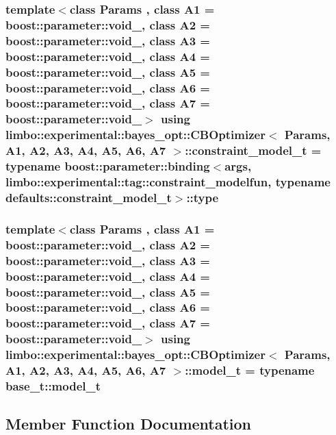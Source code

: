 \subsubsection[{\texorpdfstring{constraint\+\_\+model\+\_\+t}{constraint_model_t}}]{\setlength{\rightskip}{0pt plus 5cm}template$<$class Params , class A1  = boost\+::parameter\+::void\+\_\+, class A2  = boost\+::parameter\+::void\+\_\+, class A3  = boost\+::parameter\+::void\+\_\+, class A4  = boost\+::parameter\+::void\+\_\+, class A5  = boost\+::parameter\+::void\+\_\+, class A6  = boost\+::parameter\+::void\+\_\+, class A7  = boost\+::parameter\+::void\+\_\+$>$ using {\bf limbo\+::experimental\+::bayes\+\_\+opt\+::\+C\+B\+Optimizer}$<$ Params, A1, A2, A3, A4, A5, A6, A7 $>$\+::{\bf constraint\+\_\+model\+\_\+t} =  typename boost\+::parameter\+::binding$<${\bf args}, limbo\+::experimental\+::tag\+::constraint\+\_\+modelfun, typename {\bf defaults\+::constraint\+\_\+model\+\_\+t}$>$\+::type}\hypertarget{classlimbo_1_1experimental_1_1bayes__opt_1_1_c_b_optimizer_a5cb12c91d5ba4ea49768779178c6a2c6}{}\label{classlimbo_1_1experimental_1_1bayes__opt_1_1_c_b_optimizer_a5cb12c91d5ba4ea49768779178c6a2c6}
\subsubsection[{\texorpdfstring{model\+\_\+t}{model_t}}]{\setlength{\rightskip}{0pt plus 5cm}template$<$class Params , class A1  = boost\+::parameter\+::void\+\_\+, class A2  = boost\+::parameter\+::void\+\_\+, class A3  = boost\+::parameter\+::void\+\_\+, class A4  = boost\+::parameter\+::void\+\_\+, class A5  = boost\+::parameter\+::void\+\_\+, class A6  = boost\+::parameter\+::void\+\_\+, class A7  = boost\+::parameter\+::void\+\_\+$>$ using {\bf limbo\+::experimental\+::bayes\+\_\+opt\+::\+C\+B\+Optimizer}$<$ Params, A1, A2, A3, A4, A5, A6, A7 $>$\+::{\bf model\+\_\+t} =  typename {\bf base\+\_\+t\+::model\+\_\+t}}\hypertarget{classlimbo_1_1experimental_1_1bayes__opt_1_1_c_b_optimizer_ac4e7081d6af43c4e0d251998795717ca}{}\label{classlimbo_1_1experimental_1_1bayes__opt_1_1_c_b_optimizer_ac4e7081d6af43c4e0d251998795717ca}


\subsection{Member Function Documentation}
